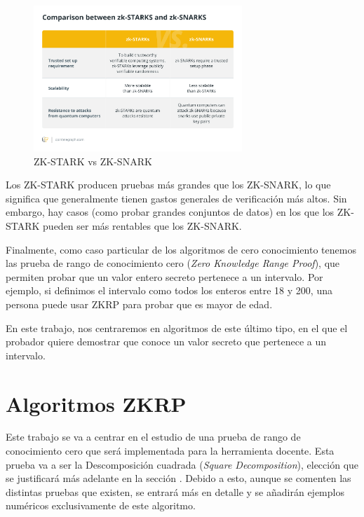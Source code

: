 \begin{figure}[ht]
    \centering
    \includegraphics[width=0.7\textwidth]{images/zkstarks vs zksnarks.jpg}
    \caption{ZK-STARK vs ZK-SNARK \cite{zk-STARKs vs zk-SNARKs}}
    \label{im:zkstarks vs zksnarks}
\end{figure}

Los ZK-STARK producen pruebas más grandes que los ZK-SNARK, lo que significa que generalmente tienen gastos generales de verificación más altos. Sin embargo, hay casos (como probar grandes conjuntos de datos) en los que los ZK-STARK pueden ser más rentables que los ZK-SNARK.

Finalmente, como caso particular de los algoritmos de cero conocimiento tenemos las prueba de rango de conocimiento cero (\emph{Zero Knowledge Range Proof}), que permiten probar que un valor entero secreto pertenece a un intervalo. Por ejemplo, si definimos el intervalo como todos los enteros entre 18 y 200, una persona puede usar ZKRP para probar que es mayor de edad.

En este trabajo, nos centraremos en algoritmos de este último tipo, en el que el probador quiere demostrar que conoce un valor secreto que pertenece a un intervalo.

\section{Algoritmos ZKRP}

Este trabajo se va a centrar en el estudio de una prueba de rango de conocimiento cero que será implementada para la herramienta docente. Esta prueba va a ser la Descomposición cuadrada (\emph{Square Decomposition}), elección que se justificará más adelante en la sección . Debido a esto, aunque se comenten las distintas pruebas que existen, se entrará más en detalle y se añadirán ejemplos numéricos exclusivamente de este algoritmo.

